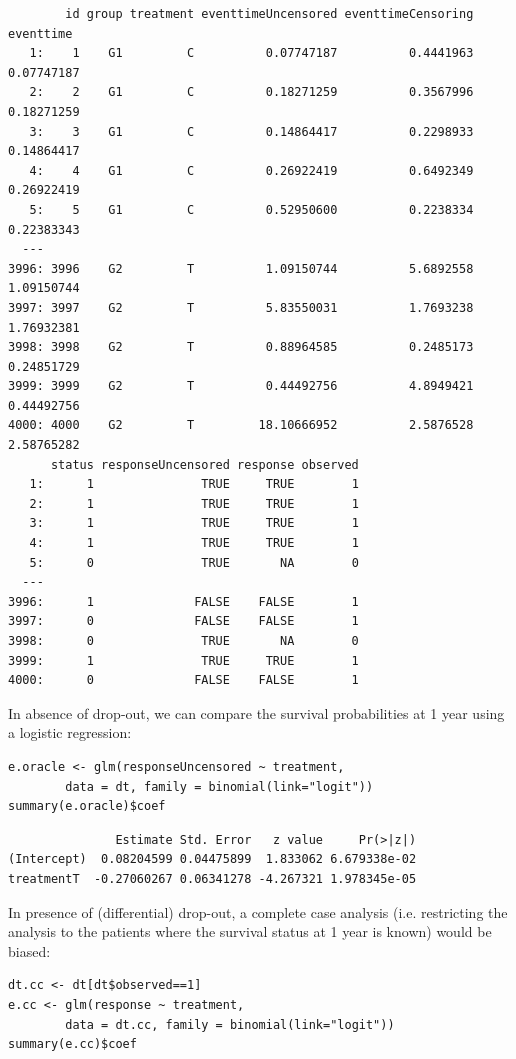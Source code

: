 \documentclass[12pt]{article}
\begin{document}
\begin{verbatim}
        id group treatment eventtimeUncensored eventtimeCensoring  eventtime
   1:    1    G1         C          0.07747187          0.4441963 0.07747187
   2:    2    G1         C          0.18271259          0.3567996 0.18271259
   3:    3    G1         C          0.14864417          0.2298933 0.14864417
   4:    4    G1         C          0.26922419          0.6492349 0.26922419
   5:    5    G1         C          0.52950600          0.2238334 0.22383343
  ---                                                                       
3996: 3996    G2         T          1.09150744          5.6892558 1.09150744
3997: 3997    G2         T          5.83550031          1.7693238 1.76932381
3998: 3998    G2         T          0.88964585          0.2485173 0.24851729
3999: 3999    G2         T          0.44492756          4.8949421 0.44492756
4000: 4000    G2         T         18.10666952          2.5876528 2.58765282
      status responseUncensored response observed
   1:      1               TRUE     TRUE        1
   2:      1               TRUE     TRUE        1
   3:      1               TRUE     TRUE        1
   4:      1               TRUE     TRUE        1
   5:      0               TRUE       NA        0
  ---                                            
3996:      1              FALSE    FALSE        1
3997:      0              FALSE    FALSE        1
3998:      0               TRUE       NA        0
3999:      1               TRUE     TRUE        1
4000:      0              FALSE    FALSE        1
\end{verbatim}

\clearpage

In absence of drop-out, we can compare the survival
probabilities at 1 year using a logistic regression:
\lstset{language=r,label= ,caption= ,captionpos=b,numbers=none}
\begin{lstlisting}
e.oracle <- glm(responseUncensored ~ treatment,
		data = dt, family = binomial(link="logit"))
summary(e.oracle)$coef
\end{lstlisting}

\begin{verbatim}
               Estimate Std. Error   z value     Pr(>|z|)
(Intercept)  0.08204599 0.04475899  1.833062 6.679338e-02
treatmentT  -0.27060267 0.06341278 -4.267321 1.978345e-05
\end{verbatim}


In presence of (differential) drop-out, a complete case analysis
(i.e. restricting the analysis to the patients where the survival
status at 1 year is known) would be biased:
\lstset{language=r,label= ,caption= ,captionpos=b,numbers=none}
\begin{lstlisting}
dt.cc <- dt[dt$observed==1]
e.cc <- glm(response ~ treatment,
	    data = dt.cc, family = binomial(link="logit"))
summary(e.cc)$coef
\end{lstlisting}
\end{document}
